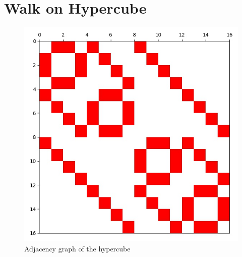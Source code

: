 \section{Walk on Hypercube}


\begin{figure}[H]
\centering
\includegraphics[width=0.5\linewidth]{./figures/results/hypercube/graph.jpg}
\caption{Adjacency graph of the hypercube}
\end{figure}

